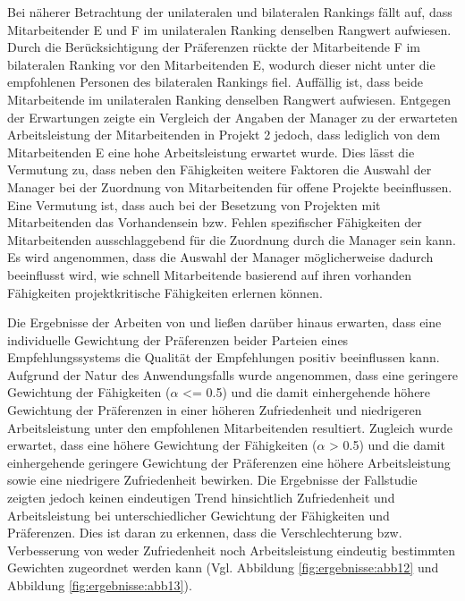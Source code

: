 Bei näherer Betrachtung der unilateralen und bilateralen Rankings fällt auf, dass Mitarbeitender E und F im unilateralen Ranking denselben Rangwert aufwiesen.
Durch die Berücksichtigung der Präferenzen rückte der Mitarbeitende F im bilateralen Ranking vor den Mitarbeitenden E, wodurch dieser nicht unter die empfohlenen Personen des bilateralen Rankings fiel.
Auffällig ist, dass beide Mitarbeitende im unilateralen Ranking denselben Rangwert aufwiesen.
Entgegen der Erwartungen zeigte ein Vergleich der Angaben der Manager zu der erwarteten Arbeitsleistung der Mitarbeitenden in Projekt 2 jedoch, dass lediglich von dem Mitarbeitenden E eine hohe Arbeitsleistung erwartet wurde.
Dies lässt die Vermutung zu, dass neben den Fähigkeiten weitere Faktoren die Auswahl der Manager bei der Zuordnung von Mitarbeitenden für offene Projekte beeinflussen.
Eine Vermutung ist, dass auch bei der Besetzung von Projekten mit Mitarbeitenden das Vorhandensein bzw. Fehlen spezifischer Fähigkeiten der Mitarbeitenden ausschlaggebend für die Zuordnung durch die Manager sein kann.  
Es wird angenommen, dass die Auswahl der Manager möglicherweise dadurch beeinflusst wird, wie schnell Mitarbeitende basierend auf ihren vorhanden Fähigkeiten projektkritische Fähigkeiten erlernen können.



Die Ergebnisse der Arbeiten von \textcite[S. 131ff.]{kleinerman:2:inproceedings} und \textcite[S. 4031 ff.]{neve:inproceedings} ließen darüber hinaus erwarten, dass eine individuelle Gewichtung der Präferenzen beider Parteien eines Empfehlungssystems die Qualität der Empfehlungen positiv beeinflussen kann.
Aufgrund der Natur des Anwendungsfalls wurde angenommen, dass eine geringere Gewichtung der Fähigkeiten ($\alpha$ <= 0.5) und die damit einhergehende höhere Gewichtung der Präferenzen in einer höheren Zufriedenheit und niedrigeren Arbeitsleistung unter den empfohlenen Mitarbeitenden resultiert.
Zugleich wurde erwartet, dass eine höhere Gewichtung der Fähigkeiten ($\alpha$ > 0.5) und die damit einhergehende geringere Gewichtung der Präferenzen eine höhere Arbeitsleistung sowie eine niedrigere Zufriedenheit bewirken.
Die Ergebnisse der Fallstudie zeigten jedoch keinen eindeutigen Trend hinsichtlich Zufriedenheit und Arbeitsleistung bei unterschiedlicher Gewichtung der Fähigkeiten und Präferenzen.
Dies ist daran zu erkennen, dass die Verschlechterung bzw. Verbesserung von weder Zufriedenheit noch Arbeitsleistung eindeutig bestimmten Gewichten zugeordnet werden kann (Vgl. Abbildung \ref{fig:ergebnisse:abb12} und Abbildung \ref{fig:ergebnisse:abb13}).

